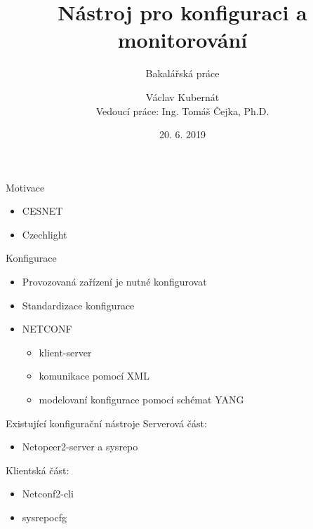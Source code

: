 \documentclass[czech,aspectratio=169]{beamer}
\title[Nástroj pro konfiguraci a monitorování]{Nástroj pro konfiguraci a monitorování}
\subtitle{Bakalářská práce}
\institute[FIT ČVUT v Praze]{Fakulta informačních technologií \\ České vysoké učení technické v Praze}
\author[V. Kubernát]{Václav Kubernát \\ Vedoucí práce: Ing. Tomáš Čejka, Ph.D.}
\date{20. 6. 2019}
\begin{document}
\begin{frame}
    \titlepage{}
\end{frame}

\begin{frame}{Motivace}
    \begin{itemize}[<+->]
        \item CESNET
        \item Czechlight
    \end{itemize}
\end{frame}

\begin{frame}{Konfigurace}
    \begin{itemize}
        \item Provozovaná zařízení je nutné konfigurovat\pause{}
        \item Standardizace konfigurace\pause{}
        \item NETCONF\pause{}
            \begin{itemize}
                \item klient-server
                \item komunikace pomocí XML
                \item modelovaní konfigurace pomocí schémat YANG
            \end{itemize}
    \end{itemize}
\end{frame}

\begin{frame}{Existující konfigurační nástroje}
Serverová část:
\begin{itemize}
    \item Netopeer2-server a sysrepo
\end{itemize}\pause{}
Klientská část:
\begin{itemize}
\item Netconf2-cli
\item sysrepocfg
\end{itemize}
\end{frame}
\end{document}
